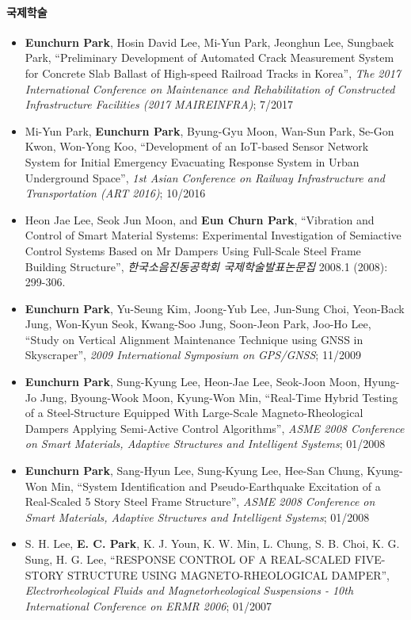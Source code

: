 \documentclass[]{article}
\providecommand{\tightlist}{%
  \setlength{\itemsep}{0pt}\setlength{\parskip}{0pt}}
\let\oldparagraph\paragraph
\renewcommand{\paragraph}[1]{\oldparagraph{#1}\mbox{}}
\begin{document}
\paragraph{국제학술}\label{uxad6duxc81cuxd559uxc220}

\begin{itemize}
\tightlist
\item
  \textbf{Eunchurn Park}, Hosin David Lee, Mi-Yun Park, Jeonghun Lee, Sungbaek Park, ``Preliminary Development of Automated Crack Measurement System for Concrete Slab Ballast of High-speed Railroad Tracks in Korea'', \emph{The 2017 International Conference on Maintenance and Rehabilitation of Constructed Infrastructure Facilities (2017 MAIREINFRA)}; 7/2017
\item
  Mi-Yun Park, \textbf{Eunchurn Park}, Byung-Gyu Moon, Wan-Sun Park, Se-Gon Kwon, Won-Yong Koo, ``Development of an IoT-based Sensor Network System for Initial Emergency Evacuating Response System in Urban Underground Space'', \emph{1st Asian Conference on Railway Infrastructure and Transportation (ART 2016)}; 10/2016
\item
  Heon Jae Lee, Seok Jun Moon, and \textbf{Eun Churn Park}, ``Vibration and Control of Smart Material Systems: Experimental Investigation of Semiactive Control Systems Based on Mr Dampers Using Full-Scale Steel Frame Building Structure'', \emph{한국소음진동공학회 국제학술발표논문집} 2008.1 (2008): 299-306.
\item
  \textbf{Eunchurn Park}, Yu-Seung Kim, Joong-Yub Lee, Jun-Sung Choi, Yeon-Back Jung, Won-Kyun Seok, Kwang-Soo Jung, Soon-Jeon Park, Joo-Ho Lee, ``Study on Vertical Alignment Maintenance Technique using GNSS in Skyscraper'', \emph{2009 International Symposium on GPS/GNSS}; 11/2009
\item
  \textbf{Eunchurn Park}, Sung-Kyung Lee, Heon-Jae Lee, Seok-Joon Moon, Hyung-Jo Jung, Byoung-Wook Moon, Kyung-Won Min, ``Real-Time Hybrid Testing of a Steel-Structure Equipped With Large-Scale Magneto-Rheological Dampers Applying Semi-Active Control Algorithms'', \emph{ASME 2008 Conference on Smart Materials, Adaptive Structures and Intelligent Systems}; 01/2008
\item
  \textbf{Eunchurn Park}, Sang-Hyun Lee, Sung-Kyung Lee, Hee-San Chung, Kyung-Won Min, ``System Identification and Pseudo-Earthquake Excitation of a Real-Scaled 5 Story Steel Frame Structure'', \emph{ASME 2008 Conference on Smart Materials, Adaptive Structures and Intelligent Systems}; 01/2008
\item
  S. H. Lee, \textbf{E. C. Park}, K. J. Youn, K. W. Min, L. Chung, S. B. Choi, K. G. Sung, H. G. Lee, ``RESPONSE CONTROL OF A REAL-SCALED FIVE-STORY STRUCTURE USING MAGNETO-RHEOLOGICAL DAMPER'', \emph{Electrorheological Fluids and Magnetorheological Suspensions - 10th International Conference on ERMR 2006}; 01/2007
\end{itemize}
\end{document}
